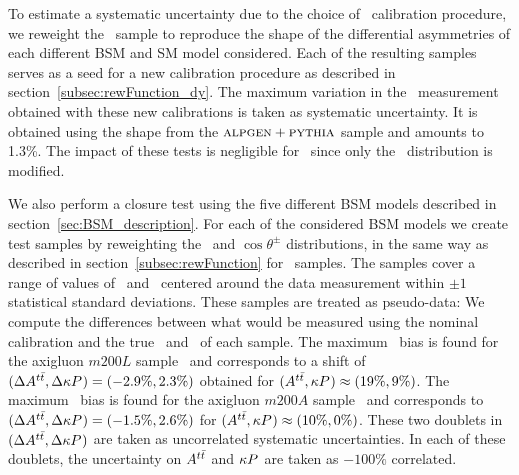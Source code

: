 \documentclass[aps,prd,twocolumn,showpacs,superscriptaddress,groupedaddress,floatfix]{revtex4}
\begin{document}
To estimate a systematic uncertainty due to the choice of  \dyttbar\ calibration procedure, we reweight the \mcatnlo\ sample
to reproduce the shape of the  differential asymmetries of each different  BSM and SM model considered.
Each of the resulting samples serves as a seed for a new calibration procedure as described in  section~\ref{subsec:rewFunction_dy}.
The maximum variation  in the  \Att\ measurement obtained with these new calibrations is taken as systematic uncertainty.
It is obtained using the shape from the $\textsc{alpgen}+\textsc{pythia}$ sample and
amounts to 1.3\%. The impact of these tests is negligible for \Ptt\
since only the \dyttbar\ distribution is modified.


We also perform a closure test using the five different BSM models described in section~\ref{sec:BSM_description}. For each of the considered BSM models  we create  test samples by reweighting the \dyttbar\ and $ \cos\theta^{\pm}$ distributions, in the same way as described in section~\ref{subsec:rewFunction} for \mcatnlo\ samples. The samples cover a range of  values of  \Att\ and \Ptt\  centered around the data measurement within  $\pm 1$  statistical standard deviations.
These samples are treated as pseudo-data: We compute the
differences between  what would be measured using the nominal calibration  and the true \Att\ and \Ptt\ of each sample.
The maximum  \Att\ bias is found for the axigluon $m200L$ sample~\cite{Carmona:2014gra} and corresponds to a shift of $(\Delta A^{t\bar t},\Delta \kappa P^{}_{})= ( -2.9\%, 2.3\%)$ obtained for $(A^{t\bar t},\kappa P^{}_{})\approx (19\%,9\%)$. 
The maximum  \Ptt\ bias is found for the axigluon $m200A$ sample~\cite{Carmona:2014gra} and corresponds to $(\Delta A^{t\bar t},\Delta \kappa P^{}_{})= ( -1.5\%, 2.6\%)$  for $(A^{t\bar t},\kappa P^{}_{})\approx (10\%,0\%)$.
These two doublets in $(\Delta A^{t\bar t},\Delta \kappa P^{}_{})$ are taken as uncorrelated  systematic uncertainties. In each of these doublets, the uncertainty on  $A^{t\bar t}$ and $\kappa P^{}_{}$ are taken as $-100\%$ correlated. 
\end{document}
